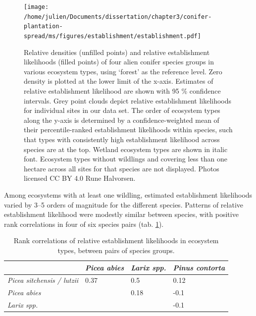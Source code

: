 \documentclass[
]{article}
\begin{document}
\newpage
\begin{landscape}

\begin{figure}
\centering
\texttt{[image: /home/julien/Documents/dissertation/chapter3/conifer-plantation-spread/ms/figures/establishment/establishment.pdf]}
\caption{\label{fig:establishment}Relative densities (unfilled points) and relative establishment likelihoods (filled points) of four alien conifer species groups in various ecosystem types, using `forest' as the reference level. Zero density is plotted at the lower limit of the x-axis. Estimates of relative establishment likelihood are shown with 95 \% confidence intervals. Grey point clouds depict relative establishment likelihoods for individual sites in our data set. The order of ecosystem types along the y-axis is determined by a confidence-weighted mean of their percentile-ranked establishment likelihoods within species, such that types with consistently high establishment likelihood across species are at the top. Wetland ecosystem types are shown in italic font. Ecosystem types without wildlings and covering less than one hectare across all sites for that species are not displayed. Photos licensed CC BY 4.0 Rune Halvorsen.}
\end{figure}

\end{landscape}

\newpage

Among ecosystems with at least one wildling, estimated establishment likelihoods varied by 3--5 orders of magnitude for the different species.
Patterns of relative establishment likelihood were modestly similar between species, with positive rank correlations in four of six species pairs (tab. \ref{tab:species-correlation-table}).

\begin{table}

\caption{\label{tab:species-correlation-table}Rank correlations of relative establishment likelihoods in ecosystem types, between pairs of species groups.}
\centering
\begin{tabular}[t]{>{}llll}
\toprule
\em{ } & \em{Picea abies} & \em{Larix spp.} & \em{Pinus contorta}\\
\midrule
\em{Picea sitchensis / lutzii} & 0.37 & 0.5 & 0.12\\
\em{Picea abies} &  & 0.18 & -0.1\\
\em{Larix spp.} &  &  & -0.1\\
\bottomrule
\end{tabular}
\end{table}
\end{document}
